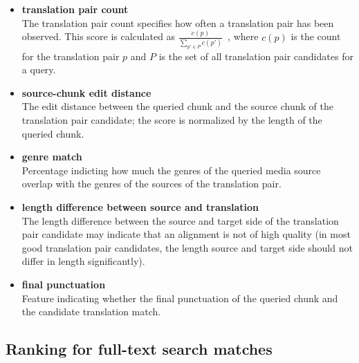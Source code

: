 \begin{itemize}
	\item \textbf{translation pair count}\\
	The translation pair count specifies how often a translation pair has been observed. This score is calculated as $\frac{c(p)}{ \sum_{p' \in P}{c(p')}  } $\ , where $c(p)$ is the count for the translation pair $p$ and $P$ is the set of all translation pair candidates for a query.
	
	\item \textbf{source-chunk edit distance}\\
	The edit distance between the queried chunk and the source chunk of the translation pair candidate; the score is normalized by the length of the queried chunk.
	
	\item \textbf{genre match}\\
	Percentage indicting how much the genres of the queried media source overlap with the genres of the sources of the translation pair.

	\item \textbf{length difference between source and translation}\\
	The length difference between the source and target side of the translation pair candidate may indicate that an alignment is not of high quality (in most good translation pair candidates,  the length source and target side should not differ in length significantly).
	
	\item \textbf{final punctuation}\\
	Feature indicating whether the final punctuation of the queried chunk and the candidate translation match.
	
	
	
\end{itemize}



\subsection{Ranking for full-text search matches}



